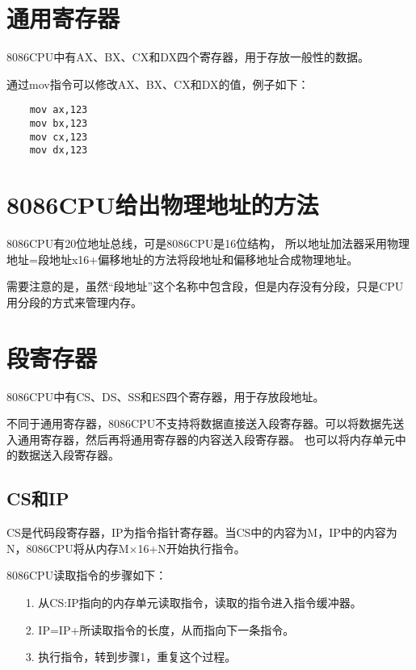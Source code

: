 \documentclass[a4paper,left=2.5cm,right=2.5cm,11pt]{article}
\begin{document}
\tableofcontents

\clearpage

\section{通用寄存器}
	8086CPU中有AX、BX、CX和DX四个寄存器，用于存放一般性的数据。\par

	通过mov指令可以修改AX、BX、CX和DX的值，例子如下：
	\begin{lstlisting}
	mov ax,123
	mov bx,123
	mov cx,123
	mov dx,123
	\end{lstlisting}

\section{8086CPU给出物理地址的方法}
	8086CPU有20位地址总线，可是8086CPU是16位结构，
	所以地址加法器采用物理地址=段地址x16+偏移地址的方法将段地址和偏移地址合成物理地址。\par

	需要注意的是，虽然“段地址”这个名称中包含段，但是内存没有分段，只是CPU用分段的方式来管理内存。

\section{段寄存器}
	8086CPU中有CS、DS、SS和ES四个寄存器，用于存放段地址。\par

	不同于通用寄存器，8086CPU不支持将数据直接送入段寄存器。可以将数据先送入通用寄存器，然后再将通用寄存器的内容送入段寄存器。
	也可以将内存单元中的数据送入段寄存器。

\subsection{CS和IP}
	CS是代码段寄存器，IP为指令指针寄存器。当CS中的内容为M，IP中的内容为N，8086CPU将从内存M$\times$16+N开始执行指令。\par

	8086CPU读取指令的步骤如下：
	\begin{itemize}
		\item[1.] 从CS:IP指向的内存单元读取指令，读取的指令进入指令缓冲器。
		\item[2.] IP=IP+所读取指令的长度，从而指向下一条指令。
		\item[3.] 执行指令，转到步骤1，重复这个过程。
	\end{itemize}
\end{document}
